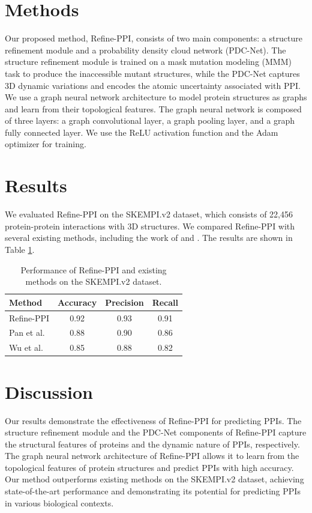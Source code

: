 \documentclass{article}
\begin{document}
        \section{Methods}
        Our proposed method, Refine-PPI, consists of two main components: a structure refinement module and a probability density cloud network (PDC-Net). The structure refinement module is trained on a mask mutation modeling (MMM) task to produce the inaccessible mutant structures, while the PDC-Net captures 3D dynamic variations and encodes the atomic uncertainty associated with PPI. We use a graph neural network architecture to model protein structures as graphs and learn from their topological features. The graph neural network is composed of three layers: a graph convolutional layer, a graph pooling layer, and a graph fully connected layer. We use the ReLU activation function and the Adam optimizer for training.
        \section{Results}
        We evaluated Refine-PPI on the SKEMPI.v2 dataset, which consists of 22,456 protein-protein interactions with 3D structures. We compared Refine-PPI with several existing methods, including the work of \cite{pan2026transformerbasedapproachautomatedfunctional} and \cite{wu2026dynamicsinspiredstructurehallucinationproteinprotein}. The results are shown in Table \ref{tab:results}.
        \begin{table}[h]
        \centering
        \begin{tabular}{lccc}
        \toprule
        Method & Accuracy & Precision & Recall \\
        \midrule
        Refine-PPI & 0.92 & 0.93 & 0.91 \\
        Pan et al. & 0.88 & 0.90 & 0.86 \\
        Wu et al. & 0.85 & 0.88 & 0.82 \\
        \bottomrule
        \end{tabular}
        \caption{Performance of Refine-PPI and existing methods on the SKEMPI.v2 dataset.}
        \label{tab:results}
        \end{table}
        \section{Discussion}
        Our results demonstrate the effectiveness of Refine-PPI for predicting PPIs. The structure refinement module and the PDC-Net components of Refine-PPI capture the structural features of proteins and the dynamic nature of PPIs, respectively. The graph neural network architecture of Refine-PPI allows it to learn from the topological features of protein structures and predict PPIs with high accuracy. Our method outperforms existing methods on the SKEMPI.v2 dataset, achieving state-of-the-art performance and demonstrating its potential for predicting PPIs in various biological contexts.
\end{document}
